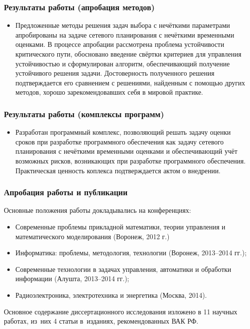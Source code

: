 \documentclass[12pt]{beamer}
\begin{document}

\begin{frame}
  \frametitle{Результаты работы (апробация методов)}
  \begin{itemize}
  \item Предложенные методы решения задач выбора с нечёткими параметрами апробированы на задаче сетевого планирования с нечёткими временными оценками. В процессе апробации рассмотрена проблема устойчивости критического пути, обосновано введение свёртки критериев для управления устойчивостью и сформулирован алгоритм, обеспечивающий получение устойчивого решения задачи. Достоверность полученного решения подтверждается его сравнением с решениями, найденным с помощью других методов, хорошо зарекомендовавших себя в мировой практике.
  \end{itemize}
\end{frame}


\begin{frame}
  \frametitle{Результаты работы (комплексы программ)}
  \begin{itemize}
    \item Разработан программный комплекс, позволяющий решать задачу оценки сроков при разработке программного обеспечения как задачу сетевого планирования с нечёткими временными оценками и обеспечивающий учёт возможных рисков, возникающих при разработке программного обеспечения. Практическая ценность коплекса подтверждается актом о внедрении.   
  \end{itemize}
\end{frame}


\begin{frame}
  \frametitle{Апробация работы и публикации}
  Основные положения работы докладывались на конференциях:
  \begin{itemize}
    \item Современные проблемы прикладной математики, теории управления и математического моделирования (Воронеж, 2012 г.)
    \item Информатика: проблемы, методология, технологии (Воронеж, 2013--2014 гг.);
    \item Современные технологии в задачах управления, автоматики и обработки информации (Алушта, 2013--2014 гг.);
    \item Радиоэлектроника, электротехника и энергетика (Москва, 2014).
  \end{itemize}
  Основное содержание диссертационного исследования изложено в 11 научных работах, из~них 4 статьи в~изданиях, рекомендованных ВАК РФ.
\end{frame}
\end{document}
